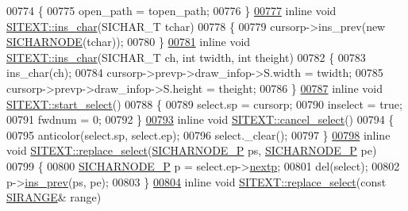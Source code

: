 \begin{DoxyCode}
00774 \{
00775     open\_path = topen\_path;
00776 \}
\hyperlink{class_s_i_t_e_x_t_a6324f46cb5b509caca467ee700305f0c}{00777} \textcolor{keyword}{inline} \textcolor{keywordtype}{void} \hyperlink{class_s_i_t_e_x_t_a6324f46cb5b509caca467ee700305f0c}{SITEXT::ins\_char}(SICHAR\_T tchar)
00778 \{
00779     cursorp->ins\_prev(\textcolor{keyword}{new} \hyperlink{class_s_i_c_h_a_r_n_o_d_e}{SICHARNODE}(tchar));
00780 \}
\hyperlink{class_s_i_t_e_x_t_aad511d1ac1db11e0f7e462e927562c4d}{00781} \textcolor{keyword}{inline} \textcolor{keywordtype}{void} \hyperlink{class_s_i_t_e_x_t_a6324f46cb5b509caca467ee700305f0c}{SITEXT::ins\_char}(SICHAR\_T ch, \textcolor{keywordtype}{int} twidth, \textcolor{keywordtype}{int} theight)
00782 \{
00783     ins\_char(ch);
00784     cursorp->prevp->draw\_infop->S.width = twidth;
00785     cursorp->prevp->draw\_infop->S.height = theight;
00786 \}
\hyperlink{class_s_i_t_e_x_t_a64816d0a3be43c67522eb09cd6b4eb94}{00787} \textcolor{keyword}{inline} \textcolor{keywordtype}{void} \hyperlink{class_s_i_t_e_x_t_a64816d0a3be43c67522eb09cd6b4eb94}{SITEXT::start\_select}()
00788 \{
00789     select.sp = cursorp;
00790     inselect = \textcolor{keyword}{true};
00791     fwdnum = 0;
00792 \}
\hyperlink{class_s_i_t_e_x_t_a3a942ca324f4c37a4d747ba7a91a293b}{00793} \textcolor{keyword}{inline} \textcolor{keywordtype}{void} \hyperlink{class_s_i_t_e_x_t_a3a942ca324f4c37a4d747ba7a91a293b}{SITEXT::cancel\_select}()
00794 \{
00795     anticolor(select.sp, select.ep);
00796     select.\_clear();
00797 \}
\hyperlink{class_s_i_t_e_x_t_ac2480043349d0c611a717c87ffbc6415}{00798} \textcolor{keyword}{inline} \textcolor{keywordtype}{void} \hyperlink{class_s_i_t_e_x_t_a5919f6a8ad7413503660035259a84fbe}{SITEXT::replace\_select}(\hyperlink{class_s_i_c_h_a_r_n_o_d_e}{SICHARNODE\_P} ps, 
      \hyperlink{class_s_i_c_h_a_r_n_o_d_e}{SICHARNODE\_P} pe)
00799 \{
00800     \hyperlink{class_s_i_c_h_a_r_n_o_d_e}{SICHARNODE\_P} p = select.ep->\hyperlink{class_s_i_c_h_a_r_n_o_d_e_ab188ae5c7731bcc66a1042defcf158c8}{nextp};
00801     del(select);
00802     p->\hyperlink{class_s_i_c_h_a_r_n_o_d_e_a0aba68c10438db18bea07bb77d70f839}{ins\_prev}(ps, pe);
00803 \}
\hyperlink{class_s_i_t_e_x_t_a5919f6a8ad7413503660035259a84fbe}{00804} \textcolor{keyword}{inline} \textcolor{keywordtype}{void} \hyperlink{class_s_i_t_e_x_t_a5919f6a8ad7413503660035259a84fbe}{SITEXT::replace\_select}(\textcolor{keyword}{const} \hyperlink{struct_s_i_r_a_n_g_e}{SIRANGE}& range)

\end{DoxyCode}
